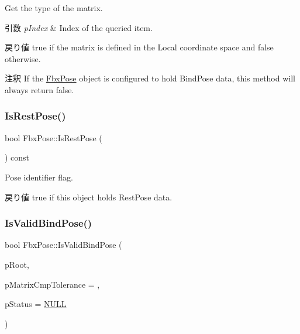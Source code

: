 Get the type of the matrix. 
\begin{DoxyParams}{引数}
{\em p\+Index} & Index of the queried item. \\
\hline
\end{DoxyParams}
\begin{DoxyReturn}{戻り値}
{\ttfamily true} if the matrix is defined in the Local coordinate space and false otherwise. 
\end{DoxyReturn}
\begin{DoxyRemark}{注釈}
If the \hyperlink{class_fbx_pose}{Fbx\+Pose} object is configured to hold Bind\+Pose data, this method will always return {\ttfamily false}. 
\end{DoxyRemark}
\mbox{\label{class_fbx_pose_a4c5f2afbe45d2a5cf0725c3cdff90dcf}} 
\subsubsection{\texorpdfstring{Is\+Rest\+Pose()}{IsRestPose()}}
{\footnotesize\ttfamily bool Fbx\+Pose\+::\+Is\+Rest\+Pose (\begin{DoxyParamCaption}{ }\end{DoxyParamCaption}) const}

Pose identifier flag. \begin{DoxyReturn}{戻り値}
{\ttfamily true} if this object holds Rest\+Pose data. 
\end{DoxyReturn}
\mbox{\label{class_fbx_pose_ac5e304f440e64f4152aac437ab8fbddc}} 
\subsubsection{\texorpdfstring{Is\+Valid\+Bind\+Pose()}{IsValidBindPose()}}
{\footnotesize\ttfamily bool Fbx\+Pose\+::\+Is\+Valid\+Bind\+Pose (\begin{DoxyParamCaption}\item[{\hyperlink{class_fbx_node}{Fbx\+Node} $\ast$}]{p\+Root,  }\item[{double}]{p\+Matrix\+Cmp\+Tolerance = {},  }\item[{\hyperlink{class_fbx_status}{Fbx\+Status} $\ast$}]{p\+Status = {\ttfamily \hyperlink{fbxarch_8h_a070d2ce7b6bb7e5c05602aa8c308d0c4}{N\+U\+LL}} }\end{DoxyParamCaption})}

